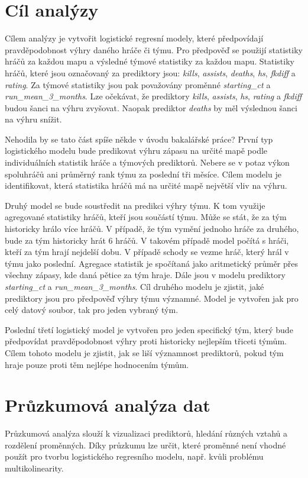 \newpage
\section{Cíl analýzy}
Cílem analýzy je vytvořit logistické regresní modely, které předpovídají pravděpodobnost výhry daného hráče či týmu. Pro předpověď se použijí statistiky hráčů
za každou mapu a výsledné týmové statistiky za každou mapu. Statistiky hráčů, které jsou označovaný za prediktory jsou: \textit{kills}, \textit{assists}, \textit{deaths},
\textit{hs}, \textit{fkdiff} a \textit{rating}. Za týmové statistiky jsou pak považovány proměnné \textit{starting\_ct} a \textit{run\_mean\_3\_months}. Lze očekávat, že
prediktory \textit{kills}, \textit{assists}, \textit{hs}, \textit{rating} a \textit{fkdiff} budou šanci na výhru zvyšovat. Naopak prediktor \textit{deaths} by měl
výslednou šanci na výhru snížit. 

{\color{green}
Nehodila by se tato část spíše někde v úvodu bakalářské práce?
}
První typ logistického modelu bude predikovat výhru zápasu na určité mapě podle individuálních statistik hráče a týmových prediktorů. Nebere se v potaz
výkon spoluhráčů ani průměrný rank týmu za poslední tři měsíce. Cílem modelu je identifikovat, která statistika hráčů má na určité mapě největší vliv na výhru.

Druhý model se bude soustředit na predikci výhry týmu. K tom využije agregované statistiky hráčů, kteří jsou součástí týmu. Může se stát, že za tým historicky hrálo více hráčů.
V případě, že tým vymění jednoho hráče za druhého, bude za tým historicky hrát 6 hráčů. V takovém případě model počítá s hráči, kteří za tým hrají nejdelší dobu. V případě schody
se vezme hráč, který hrál v týmu jako poslední. Agregace statistik je spočítaná jako aritmetický průměr přes všechny zápasy, kde daná pětice za tým hraje. Dále jsou v modelu
prediktory \textit{starting\_ct} a \textit{run\_mean\_3\_months}. Cíl druhého modelu je zjistit, jaké prediktory jsou pro předpověď výhry týmu významné. Model je vytvořen
jak pro celý datový soubor, tak pro jeden vybraný tým.

Poslední třetí logistický model je vytvořen pro jeden specifický tým, který bude předpovídat pravděpodobnost výhry proti historicky nejlepším třiceti týmům. Cílem tohoto modelu
je zjistit, jak se liší významnost prediktorů, pokud tým hraje pouze proti těm nejlépe hodnocením týmům. 

\section{Průzkumová analýza dat}
Průzkumová analýza slouží k vizualizaci prediktorů, hledání různých vztahů a rozdělení proměnných. Díky průzkumu lze určit, které proměnné není vhodné použít pro tvorbu
logistického regresního modelu, např. kvůli problému multikolinearity.

